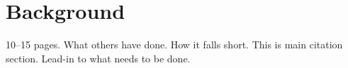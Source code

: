 \section{Background}
10--15 pages.
What others have done.
How it falls short.
This is main citation section.
Lead-in to what needs to be done.
